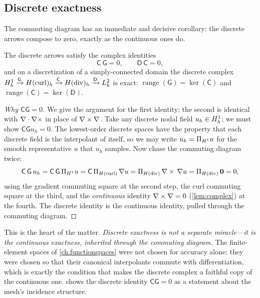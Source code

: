 \subsection{Discrete exactness}
\label{sec:discrete-exact}

The commuting diagram has an immediate and decisive corollary: the discrete arrows
compose to zero, exactly as the continuous ones do.

\begin{theorem}\label{thm:discrete-exact}
The discrete arrows satisfy the complex identities
\[
  \mathsf{C}\,\mathsf{G} = 0, \qquad \mathsf{D}\,\mathsf{C} = 0,
\]
and on a discretization of a simply-connected domain the discrete complex
$H^1_h\xrightarrow{\mathsf{G}}H(\mathrm{curl})_h\xrightarrow{\mathsf{C}}H(\mathrm{div})_h
\xrightarrow{\mathsf{D}}L^2_h$ is exact:
$\operatorname{range}(\mathsf{G})=\ker(\mathsf{C})$ and
$\operatorname{range}(\mathsf{C})=\ker(\mathsf{D})$.
\end{theorem}

\begin{proof}[Why $\mathsf{C}\mathsf{G}=0$]
We give the argument for the first identity; the second is identical with $\nabla\cdot\nabla\times$
in place of $\nabla\times\nabla$. Take any discrete nodal field $u_h\in H^1_h$; we must show
$\mathsf{C}\mathsf{G}u_h=0$. The lowest-order discrete spaces have the property that
each discrete field is the interpolant of itself, so we may write $u_h=\Pi_{H^1}u$
for the smooth representative $u$ that $u_h$ samples. Now chase the commuting diagram
twice:
\[
  \mathsf{C}\,\mathsf{G}\,u_h
  = \mathsf{C}\,\mathsf{G}\,\Pi_{H^1}u
  = \mathsf{C}\,\Pi_{H(\mathrm{curl})}\,\nabla u
  = \Pi_{H(\mathrm{div})}\,\nabla\times\,\nabla u
  = \Pi_{H(\mathrm{div})}\,\mathbf{0}
  = 0,
\]
using the gradient commuting square at the second step, the curl commuting square at
the third, and the \emph{continuous} identity $\nabla\times\nabla=0$ (\cref{lem:complex}) at
the fourth. The discrete identity is the continuous identity, pulled through the
commuting diagram.
\end{proof}

This is the heart of the matter. \emph{Discrete exactness is not a separate
miracle---it is the continuous exactness, inherited through the commuting diagram.}
The finite-element spaces of \cref{ch:functionspaces} were not chosen for accuracy
alone; they were chosen so that their canonical interpolants commute with
differentiation, which is exactly the condition that makes the discrete complex a
faithful copy of the continuous one.  shows the discrete identity
$\mathsf{C}\mathsf{G}=0$ as a statement about the mesh's incidence structure.

